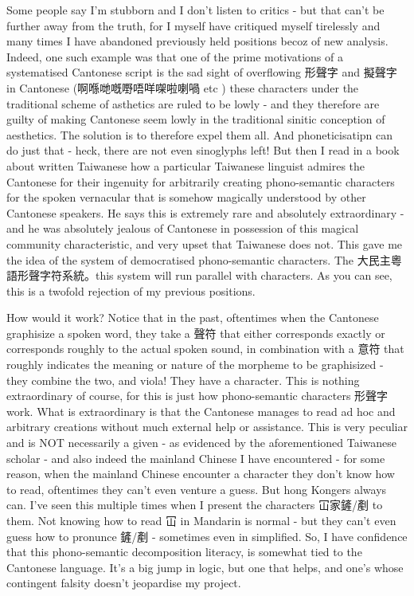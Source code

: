 \documentclass[a5paper, 10pt, openany]{book} %
\begin{document}
Some people say I'm stubborn and I don't listen to critics - but that can't be further away from the truth, for I myself have critiqued myself tirelessly and many times I have abandoned previously held positions becoz of new analysis. Indeed, one such example was that one of the prime motivations of a systematised Cantonese script is the sad sight of overflowing 形聲字 and 擬聲字 in Cantonese (啊喺哋嘅嘢唔咩㗎啦喇喎 etc ) these characters under the traditional scheme of asthetics are ruled to be lowly - and they therefore are guilty of making Cantonese seem lowly in the traditional sinitic conception of aesthetics. The solution is to therefore expel them all. And phoneticisatipn can do just that - heck, there are not even sinoglyphs left! But then I read in a book about written Taiwanese how a particular Taiwanese linguist admires the Cantonese for their ingenuity for arbitrarily creating phono-semantic characters for the spoken vernacular that is somehow magically understood by other Cantonese speakers. He says this is extremely rare and absolutely extraordinary - and he was absolutely jealous of Cantonese in possession of this magical community characteristic, and very upset that Taiwanese does not. This gave me the idea of the system of democratised phono-semantic characters. The 大民主粵語形聲字符系統。this system will run parallel with characters. As you can see, this is a twofold rejection of my previous positions.


How would it work? Notice that in the past, oftentimes when the Cantonese graphisize a spoken word, they take a 聲符 that either corresponds exactly or corresponds roughly to the actual spoken sound, in combination with a 意符 that roughly indicates the meaning or nature of the morpheme to be graphisized - they combine the two, and viola! They have a character.          This is nothing extraordinary of course, for this is just how phono-semantic characters 形聲字 work. What is extraordinary is that the Cantonese manages to read ad hoc and arbitrary creations without much external help or assistance. This is very peculiar and is NOT necessarily a given - as evidenced by the aforementioned Taiwanese scholar - and also indeed the mainland Chinese I have encountered - for some reason, when the mainland Chinese encounter a character they don't know how to read, oftentimes they can't even venture a guess. But hong Kongers always can. I've seen this multiple times when I present the characters 冚家鏟/剷 to them. Not knowing how to read 冚 in Mandarin is normal - but they can't even guess how to pronunce 鏟/剷 - sometimes even in simplified. So, I have confidence that this phono-semantic decomposition literacy, is somewhat tied to the Cantonese language. It's a big jump in logic, but one that helps, and one's whose contingent falsity doesn't jeopardise my project.
\end{document}
